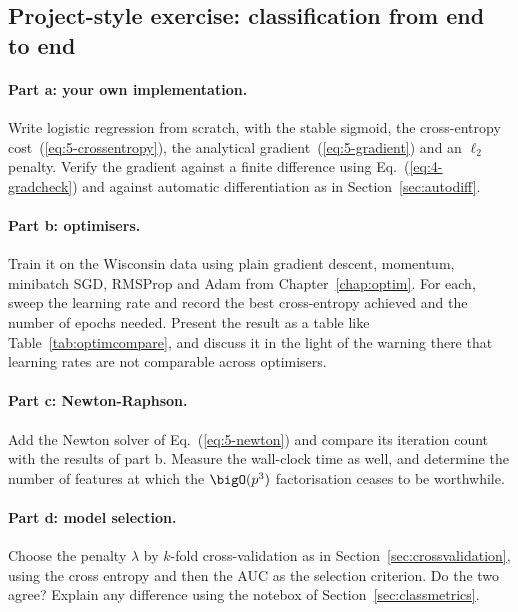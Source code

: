 \subsection*{Project-style exercise: classification from end to end}

\paragraph{Part a: your own implementation.}
Write logistic regression from scratch, with the stable sigmoid, the
cross-entropy cost~(\ref{eq:5-crossentropy}), the analytical
gradient~(\ref{eq:5-gradient}) and an $\ell_2$ penalty.  Verify the gradient
against a finite difference using Eq.~(\ref{eq:4-gradcheck}) and against
automatic differentiation as in Section~\ref{sec:autodiff}.

\paragraph{Part b: optimisers.}
Train it on the Wisconsin data using plain gradient descent, momentum,
minibatch SGD, RMSProp and Adam from Chapter~\ref{chap:optim}.  For each,
sweep the learning rate and record the best cross-entropy achieved and the
number of epochs needed.  Present the result as a table like
Table~\ref{tab:optimcompare}, and discuss it in the light of the warning there
that learning rates are not comparable across optimisers.

\paragraph{Part c: Newton-Raphson.}
Add the Newton solver of Eq.~(\ref{eq:5-newton}) and compare its iteration
count with the results of part b.  Measure the wall-clock time as well, and
determine the number of features at which the $\bigO(p^{3})$ factorisation
ceases to be worthwhile.

\paragraph{Part d: model selection.}
Choose the penalty $\lambda$ by $k$-fold cross-validation as in
Section~\ref{sec:crossvalidation}, using the cross entropy and then the AUC as
the selection criterion.  Do the two agree?  Explain any difference using the
notebox of Section~\ref{sec:classmetrics}.

